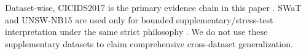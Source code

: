 Dataset-wise, CICIDS2017 is the primary evidence chain in this paper \cite{sharafaldin2018cicids}. SWaT and UNSW-NB15 are used only for bounded supplementary/stress-test interpretation under the same strict philosophy \cite{goh2016swat,moustafa2015unsw}. We do not use these supplementary datasets to claim comprehensive cross-dataset generalization.
